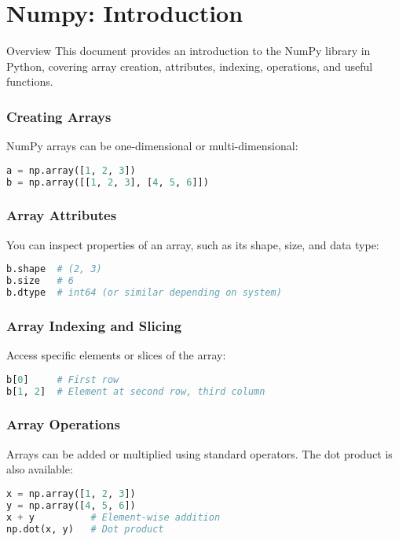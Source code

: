 \section{Numpy: Introduction}
\begin{frame}[plain]
\sectionpage
\end{frame}


\begin{frame}{Overview}
This document provides an introduction to the NumPy library in Python, covering array creation, attributes, indexing, operations, and useful functions.
\end{frame}


\begin{frame}[fragile]
\frametitle{Creating Arrays}
NumPy arrays can be one-dimensional or multi-dimensional:

\begin{lstlisting}[language=Python]
a = np.array([1, 2, 3])
b = np.array([[1, 2, 3], [4, 5, 6]])
\end{lstlisting}

\end{frame}


\begin{frame}[fragile]
\frametitle{Array Attributes}
You can inspect properties of an array, such as its shape, size, and data type:

\begin{lstlisting}[language=Python]
b.shape  # (2, 3)
b.size   # 6
b.dtype  # int64 (or similar depending on system)
\end{lstlisting}

\end{frame}

\begin{frame}[fragile]
\frametitle{Array Indexing and Slicing}
Access specific elements or slices of the array:

\begin{lstlisting}[language=Python]
b[0]     # First row
b[1, 2]  # Element at second row, third column
\end{lstlisting}

\end{frame}


\begin{frame}[fragile]
\frametitle{Array Operations}
Arrays can be added or multiplied using standard operators. The dot product is also available:

\begin{lstlisting}[language=Python]
x = np.array([1, 2, 3])
y = np.array([4, 5, 6])
x + y          # Element-wise addition
np.dot(x, y)   # Dot product
\end{lstlisting}

\end{frame}


